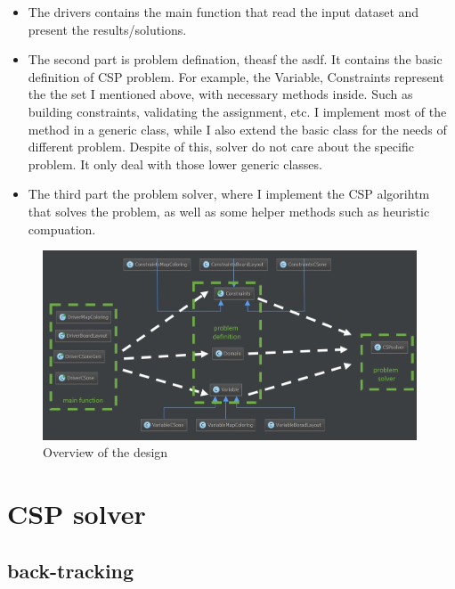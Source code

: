 \documentclass{article}
\begin{document}
\begin{itemize}
  \item The drivers contains the main function that read the input dataset and present the results/solutions.
  \item  The second part is problem defination, theasf the asdf. It contains the basic definition of CSP problem. For example, the Variable, Constraints represent the the set I mentioned above, with necessary methods inside. Such as building constraints, validating the assignment, etc. I implement most of the method in a generic class, while I also extend the basic class for the needs of different problem. Despite of this, solver do not care about the specific problem. It only deal with those lower generic classes.
  \item The third part the problem solver, where I implement the CSP algorihtm that solves the problem, as well as some helper methods such as heuristic compuation.
\end{itemize}
\begin{figure}[!h]
\centering
\includegraphics[width=0.99\textwidth]{class_layout.png}
\caption{Overview of the design}
\label{classlayout}
\end{figure}




















\clearpage
\section{CSP solver}
\subsection{back-tracking}
\end{document}
